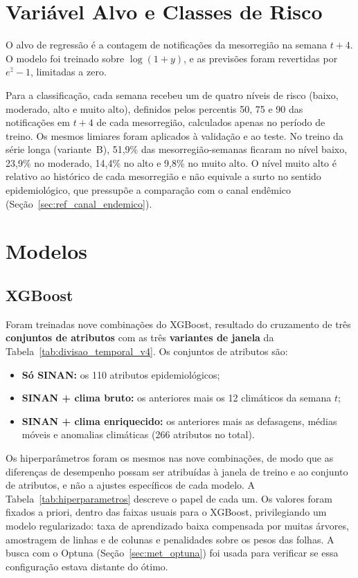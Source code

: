 \section{Variável Alvo e Classes de Risco}
\label{sec:classes_risco}

O alvo de regressão é a contagem de notificações da mesorregião na semana $t+4$. O modelo foi treinado sobre $\log(1+y)$, e as previsões foram revertidas por $e^{\hat{z}}-1$, limitadas a zero.

Para a classificação, cada semana recebeu um de quatro níveis de risco (baixo, moderado, alto e muito alto), definidos pelos percentis 50, 75 e 90 das notificações em $t+4$ de cada mesorregião, calculados apenas no período de treino. Os mesmos limiares foram aplicados à validação e ao teste. No treino da série longa (variante~B), 51,9\% das mesorregião-semanas ficaram no nível baixo, 23,9\% no moderado, 14,4\% no alto e 9,8\% no muito alto. O nível muito alto é relativo ao histórico de cada mesorregião e não equivale a surto no sentido epidemiológico, que pressupõe a comparação com o canal endêmico (Seção~\ref{sec:ref_canal_endemico}).

\section{Modelos}

\subsection{XGBoost}

Foram treinadas nove combinações do XGBoost, resultado do cruzamento de três \textbf{conjuntos de atributos} com as três \textbf{variantes de janela} da Tabela~\ref{tab:divisao_temporal_v4}. Os conjuntos de atributos são:
\label{sec:eng_atributos}

\begin{itemize}
    \item \textbf{Só SINAN:} os 110 atributos epidemiológicos;
    \item \textbf{SINAN + clima bruto:} os anteriores mais os 12 climáticos da semana $t$;
    \item \textbf{SINAN + clima enriquecido:} os anteriores mais as defasagens, médias móveis e anomalias climáticas (266 atributos no total).
\end{itemize}

Os hiperparâmetros foram os mesmos nas nove combinações, de modo que as diferenças de desempenho possam ser atribuídas à janela de treino e ao conjunto de atributos, e não a ajustes específicos de cada modelo. A Tabela~\ref{tab:hiperparametros} descreve o papel de cada um. Os valores foram fixados a priori, dentro das faixas usuais para o XGBoost, privilegiando um modelo regularizado: taxa de aprendizado baixa compensada por muitas árvores, amostragem de linhas e de colunas e penalidades sobre os pesos das folhas. A busca com o Optuna (Seção~\ref{sec:met_optuna}) foi usada para verificar se essa configuração estava distante do ótimo.

